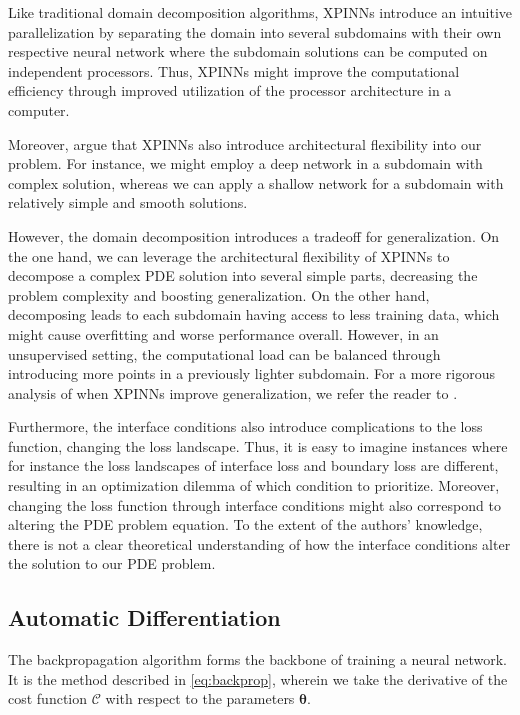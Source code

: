 Like traditional domain decomposition algorithms, XPINNs introduce an intuitive parallelization by separating the domain into several subdomains with their own respective neural network where the subdomain solutions can be computed on independent processors.
Thus, XPINNs might improve the computational efficiency through improved utilization of the processor architecture in a computer.

Moreover, \textcite{Jagtap2020ExtendedPN} argue that XPINNs also introduce architectural flexibility into our problem.
For instance, we might employ a deep network in a subdomain with complex solution, whereas we can apply a shallow network for a subdomain with relatively simple and smooth solutions. 

However, the domain decomposition introduces a tradeoff for generalization.
On the one hand, we can leverage the architectural flexibility of XPINNs to decompose a complex PDE solution into several simple parts, decreasing the problem complexity and boosting generalization.
On the other hand, decomposing leads to each subdomain having access to less training data, which might cause overfitting and worse performance overall.
However, in an unsupervised setting, the computational load can be balanced through introducing more points in a previously lighter subdomain.
For a more rigorous analysis of when XPINNs improve generalization, we refer the reader to \cite{XPINN_generalize}.

Furthermore, the interface conditions also introduce complications to the loss function, changing the loss landscape.
Thus, it is easy to imagine instances where for instance the loss landscapes of interface loss and boundary loss are different, resulting in an optimization dilemma of which condition to prioritize.
Moreover, changing the loss function through interface conditions might also correspond to altering the PDE problem equation.
To the extent of the authors' knowledge, there is not a clear theoretical understanding of how the interface conditions alter the solution to our PDE problem. 

\subsection{Automatic Differentiation}\label{sec:autodiff}
The backpropagation algorithm \cite{Backpropogation1986} forms the backbone of training a neural network.
It is the method described in \eqref{eq:backprop}, wherein we take the derivative of the cost function $\mathcal{C}$ with respect to the parameters $\boldsymbol{\theta}$.

